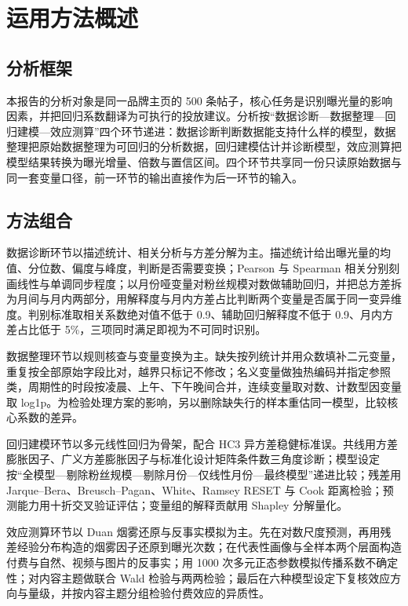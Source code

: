 ﻿%
\section{运用方法概述}
\subsection{分析框架}

本报告的分析对象是同一品牌主页的 500 条帖子，核心任务是识别曝光量的影响因素，并把回归系数翻译为可执行的投放建议。分析按“数据诊断—数据整理—回归建模—效应测算”四个环节递进：数据诊断判断数据能支持什么样的模型，数据整理把原始数据整理为可回归的分析数据，回归建模估计并诊断模型，效应测算把模型结果转换为曝光增量、倍数与置信区间。四个环节共享同一份只读原始数据与同一套变量口径，前一环节的输出直接作为后一环节的输入。

\subsection{方法组合}

数据诊断环节以描述统计、相关分析与方差分解为主。描述统计给出曝光量的均值、分位数、偏度与峰度，判断是否需要变换；Pearson 与 Spearman 相关分别刻画线性与单调同步程度；以月份哑变量对粉丝规模对数做辅助回归，并把总方差拆为月间与月内两部分，用解释度与月内方差占比判断两个变量是否属于同一变异维度。判别标准取相关系数绝对值不低于 0.9、辅助回归解释度不低于 0.9、月内方差占比低于 5\%，三项同时满足即视为不可同时识别。

数据整理环节以规则核查与变量变换为主。缺失按列统计并用众数填补二元变量，重复按全部原始字段比对，越界只标记不修改；名义变量做独热编码并指定参照类，周期性的时段按凌晨、上午、下午晚间合并，连续变量取对数、计数型因变量取 log1p。为检验处理方案的影响，另以删除缺失行的样本重估同一模型，比较核心系数的差异。

回归建模环节以多元线性回归为骨架，配合 HC3 异方差稳健标准误。共线用方差膨胀因子、广义方差膨胀因子与标准化设计矩阵条件数三角度诊断；模型设定按“全模型—剔除粉丝规模—剔除月份—仅线性月份—最终模型”递进比较；残差用 Jarque--Bera、Breusch--Pagan、White、Ramsey RESET 与 Cook 距离检验；预测能力用十折交叉验证评估；变量组的解释贡献用 Shapley 分解量化。

效应测算环节以 Duan 烟雾还原与反事实模拟为主。先在对数尺度预测，再用残差经验分布构造的烟雾因子还原到曝光次数；在代表性画像与全样本两个层面构造付费与自然、视频与图片的反事实；用 1000 次多元正态参数模拟传播系数不确定性；对内容主题做联合 Wald 检验与两两检验；最后在六种模型设定下复核效应方向与量级，并按内容主题分组检验付费效应的异质性。

